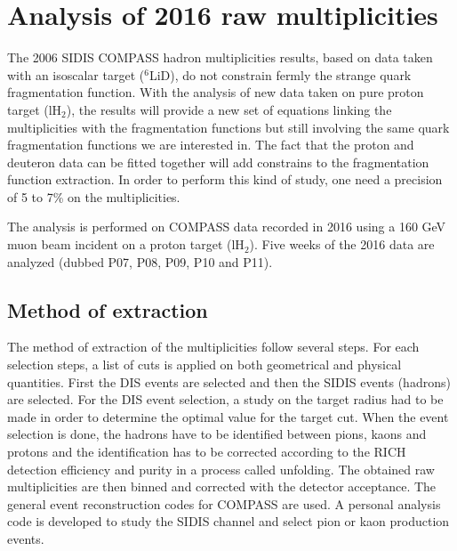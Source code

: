 
\chapter{Analysis of 2016 raw multiplicities} %

\label{ch:raw} %

The 2006 SIDIS COMPASS hadron multiplicities results, based on data taken with an isoscalar target ($^6$LiD), do not constrain fermly the strange quark fragmentation function.
With the analysis of new data taken on pure proton target (lH$_2$), the results will provide a new set of equations linking the multiplicities with the fragmentation functions but still involving the same quark fragmentation functions we are interested in. The fact that the proton and deuteron data can be fitted together will add constrains to the fragmentation function extraction.
In order to perform this kind of study, one need a precision of 5 to 7\% on the multiplicities.

The analysis is performed on COMPASS data recorded in 2016 using a 160 GeV muon beam incident on a proton target (lH$_2$). Five weeks of the 2016 data are analyzed (dubbed P07, P08, P09, P10 and P11).


\section{Method of extraction}

The method of extraction of the multiplicities follow several steps. For each selection steps,
a list of cuts is applied on both geometrical and physical quantities. First the DIS events are selected
and then the SIDIS events (hadrons) are selected. For the DIS event selection, a study on the target radius
had to be made in order to determine the optimal value for the target cut. When the event selection is done, the hadrons have to be identified between pions, kaons and protons and the identification has to be corrected according to the RICH detection efficiency and purity in a process called unfolding. The obtained raw multiplicities are then binned and corrected with the detector acceptance. The general event reconstruction codes for COMPASS are used. A personal analysis code is developed to study the SIDIS channel and select pion or kaon production events.

